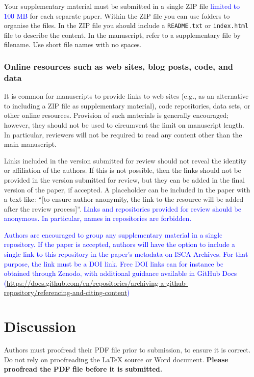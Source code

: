 \documentclass{Interspeech}
\newcommand{\blue}[1]{\textcolor{blue}{#1}}
\begin{document}
Your supplementary material must be submitted in a single ZIP file \blue{limited to 100 MB} for each separate paper. Within the ZIP file you can use folders to organise the files. In the ZIP file you should include a \texttt{README.txt} or \texttt{index.html} file to describe the content. In the manuscript, refer to a supplementary file by filename. Use short file names with no spaces.

\subsubsection{Online resources such as web sites, blog posts, code, and data}
\label{section:repos}

It is common for manuscripts to provide links to web sites (e.g., as an alternative to including a ZIP file as supplementary material), code repositories, data sets, or other online resources. Provision of such materials is generally encouraged; however, they should not be used to circumvent the limit on manuscript length. In particular, reviewers will not be required to read any content other than the main manuscript.

Links included in the version submitted for review should not reveal the identity or affiliation of the authors. If this is not possible, then the links should not be provided in the version submitted for review, but they can be added in the final version of the paper, if accepted. A placeholder can be included in the paper with a text like: ``[to ensure author anonymity, the link to the resource will be added after the review process]''. \blue{Links and repositories provided for review should be anonymous. In particular, names in repositories are forbidden.}

\blue{Authors are encouraged to group any supplementary material in a single repository. If the paper is accepted, authors will have the option to include a single link to this repository in the paper's metadata on ISCA Archives. For that purpose, the link must be a DOI link. Free DOI links can for instance be obtained through Zenodo, with additional guidance available in GitHub Docs (\url{https://docs.github.com/en/repositories/archiving-a-github-repository/referencing-and-citing-content})}

\section{Discussion}

Authors must proofread their PDF file prior to submission, to ensure it is correct. Do not rely on proofreading the \LaTeX\xspace source or Word document. \textbf{Please proofread the PDF file before it is submitted.}
\end{document}
